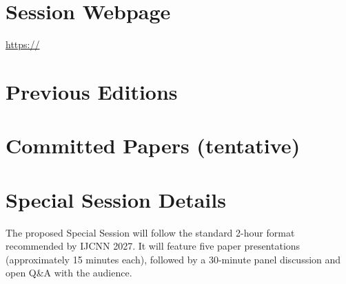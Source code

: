 \documentclass{article}
\begin{document}
\section*{Session Webpage}
\noindent
\url{https://}

\section*{Previous Editions}
\noindent


\section*{Committed Papers (tentative)}




\section*{Special Session Details}
\noindent
The proposed Special Session will follow the standard 2-hour format recommended by IJCNN 2027. It will feature five paper presentations (approximately 15 minutes each), followed by a 30-minute panel discussion and open Q\&A with the audience. 
\end{document}
